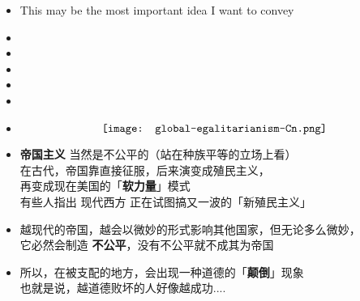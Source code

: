 \begin{preview}
\begin{minipage}{\textwidth}
\begin{itemize}
	\item {}
		{This may be the most important idea I want to convey}
	\item {}
		{}
	\item {}
		{}
	\item {}
		{}
	\item {}
		{}
	\item {}
		{}
	\item {}
		{}
	\begin{equation}
		\vcenter{\hbox{\texttt{[image: global-egalitarianism-Cn.png]}}}
		\nonumber
	\end{equation}
	\item \textbf{帝国主义} 当然是不公平的（站在种族平等的立场上看） \\
		在古代，帝国靠直接征服，后来演变成殖民主义， \\
		再变成现在美国的「\textbf{软力量}」模式 \\
		有些人指出 现代西方 正在试图搞又一波的「新殖民主义」
	\item 越现代的帝国，越会以微妙的形式影响其他国家，但无论多么微妙，\\
		它必然会制造 \textbf{不公平}，没有不公平就不成其为帝国
	\item 所以，在被支配的地方，会出现一种道德的「\textbf{颠倒}」现象 \\
		也就是说，越道德败坏的人好像越成功.... 

\end{itemize}

\end{minipage}
\end{preview}

